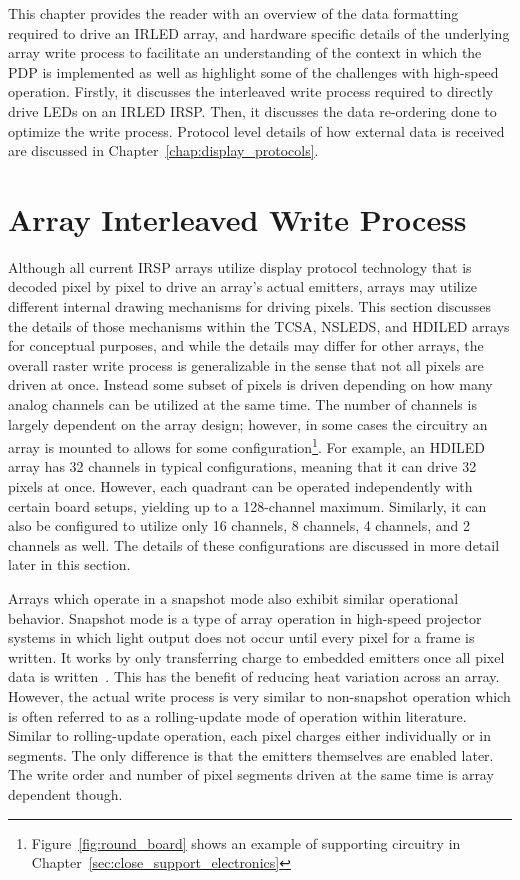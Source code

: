 \label{chap:array_write_process}
This chapter provides the reader with an overview of the data formatting required to drive an IRLED array, and hardware specific details of the underlying array write process to facilitate an understanding of the context in which the PDP is implemented as well as highlight some of the challenges with high-speed operation. Firstly, it discusses the interleaved write process required to directly drive LEDs on an IRLED IRSP. Then, it discusses the data re-ordering done to optimize the write process. Protocol level details of how external data is received are discussed in Chapter~\ref{chap:display_protocols}.


\section{Array Interleaved Write Process}
    \label{sec:array_Interleaved_write_process}
    Although all current IRSP arrays utilize display protocol technology that is decoded pixel by pixel to drive an array's actual emitters, arrays may utilize different internal drawing mechanisms for driving pixels. This section discusses the details of those mechanisms within the TCSA, NSLEDS, and HDILED arrays for conceptual purposes, and while the details may differ for other arrays, the overall raster write process is generalizable in the sense that not all pixels are driven at once. Instead some subset of pixels is driven depending on how many analog channels can be utilized at the same time. The number of channels is largely dependent on the array design; however, in some cases the circuitry an array is mounted to allows for some configuration\footnote{Figure~\ref{fig:round_board} shows an example of supporting circuitry in Chapter~\ref{sec:close_support_electronics}}. For example, an HDILED array has 32 channels in typical configurations, meaning that it can drive 32 pixels at once. However, each quadrant can be operated independently with certain board setups, yielding up to a 128-channel maximum. Similarly, it can also be configured to utilize only 16 channels, 8 channels, 4 channels, and 2 channels as well. The details of these configurations are discussed in more detail later in this section.

    Arrays which operate in a snapshot mode also exhibit similar operational behavior. Snapshot mode is a type of array operation in high-speed projector systems in which light output does not occur until every pixel for a frame is written. It works by only transferring charge to embedded emitters once all pixel data is written~\cite{McHughEtAl1999}. This has the benefit of reducing heat variation across an array. However, the actual write process is very similar to non-snapshot operation which is often referred to as a rolling-update mode of operation within literature. Similar to rolling-update operation, each pixel charges either individually or in segments. The only difference is that the emitters themselves are enabled later. The write order and number of pixel segments driven at the same time is array dependent though.

